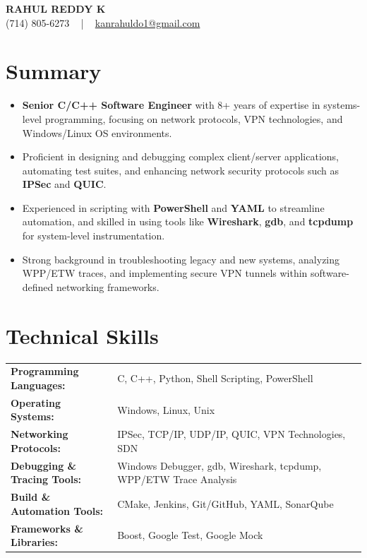 \documentclass[letterpaper,11pt]{article}
\newcommand{\resumeItem}[1]{
  \item\footnotesize{
    {#1 \vspace{-2pt}}
  }
}
\newcommand{\resumeItemListStart}{\begin{itemize}[leftmargin=*]}
\newcommand{\resumeItemListEnd}{\end{itemize}\vspace{-5pt}}
\begin{document}
\begin{center}
    {\fontsize{14pt}{12pt}\selectfont \textbf{\MakeUppercase{Rahul Reddy K}}}\\ \vspace{2pt}
    \fontsize{10pt}{12pt}\selectfont (714) 805-6273 ~ | ~ \href{mailto:kanrahuldo1@gmail.com}{kanrahuldo1@gmail.com}~
    \vspace{-8pt}
\end{center}

\section{Summary}
\fontsize{9pt}{10pt}\selectfont
\resumeItemListStart
    \resumeItem{\textbf{Senior C/C++ Software Engineer} with 8+ years of expertise in systems-level programming, focusing on network protocols, VPN technologies, and Windows/Linux OS environments.}
    \resumeItem{Proficient in designing and debugging complex client/server applications, automating test suites, and enhancing network security protocols such as \textbf{IPSec} and \textbf{QUIC}.}
    \resumeItem{Experienced in scripting with \textbf{PowerShell} and \textbf{YAML} to streamline automation, and skilled in using tools like \textbf{Wireshark}, \textbf{gdb}, and \textbf{tcpdump} for system-level instrumentation.}
    \resumeItem{Strong background in troubleshooting legacy and new systems, analyzing WPP/ETW traces, and implementing secure VPN tunnels within software-defined networking frameworks.}
\resumeItemListEnd
\vspace{-6pt}

\section{Technical Skills}
        \vspace{-14pt}
        \begin{table}[h]
            \fontsize{9pt}{10pt}\selectfont
            \begin{tabular}{p{0.3\linewidth} p{0.7\linewidth}}
                \textbf{Programming Languages:} & C, C++, Python, Shell Scripting, PowerShell \\
                \textbf{Operating Systems:} & Windows, Linux, Unix \\
                \textbf{Networking Protocols:} & IPSec, TCP/IP, UDP/IP, QUIC, VPN Technologies, SDN \\
                \textbf{Debugging \& Tracing Tools:} & Windows Debugger, gdb, Wireshark, tcpdump, WPP/ETW Trace Analysis \\
                \textbf{Build \& Automation Tools:} & CMake, Jenkins, Git/GitHub, YAML, SonarQube \\
                \textbf{Frameworks \& Libraries:} & Boost, Google Test, Google Mock \\
            \end{tabular}
        \end{table}
    \vspace{-15pt}
\end{document}
